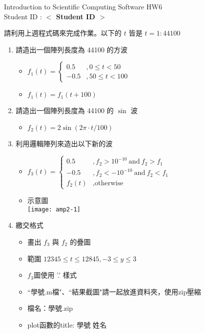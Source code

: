 \documentclass[12pt,a4paper]{article}
\newcommand{\placeholder}[1]{\textbf{$<$ #1 $>$}}
\newcommand{\idnumber}{\placeholder{Student ID}}
\begin{document}
\begin{CJK}{UTF8}{bsmi}
\begin{flushleft}Introduction to Scientific Computing Software HW6
\\Student ID : \idnumber{}\end{flushleft}

請利用上週程式碼來完成作業。以下的 $t$ 皆是 $t=1:44100$
\begin{enumerate}
\item 請造出一個陣列長度為 44100 的方波
\begin{itemize} 


\item $f_1(t)=\left\{\begin{array}{ll}0.5&,0 \le t < 50 \\ -0.5 &,50 \le t < 100\end{array}\right.$
\item $f_1(t)=f_1(t+100)$
\end{itemize}
\item 請造出一個陣列長度為 44100 的 $\sin$ 波
\begin{itemize}

\item $f_2(t)=2\sin(2\pi \cdot t/100)$
\end{itemize}

\item 利用邏輯陣列來造出以下新的波
\begin{itemize}

\item $f_3(t)=\left\{\begin{array}{ll}0.5&, f_2>10^{-10}\ \mbox{and}\ f_2>f_1 \\ -0.5 &,f_2<-10^{-10}\ \mbox{and}\ f_2<f_1 \\f_2(t) & ,\mbox{otherwise} \end{array}\right.$
\item 示意圖 \\ \texttt{[image: amp2-1]}
\end{itemize}
\item 繳交格式
\begin{itemize}
\item  畫出 $f_3$ 與 $f_2$ 的疊圖
\item  範圍 $12345\le t \le 12845, -3\le y \le 3$
\item  $f_3$圖使用 '.' 樣式
\item ``學號.m檔"、``結果截圖"請一起放進資料夾，使用zip壓縮
\item  檔名：學號.zip
\item  plot函數的title: 學號  姓名
\end{itemize}
\end{enumerate}
\end{CJK}
\end{document}
